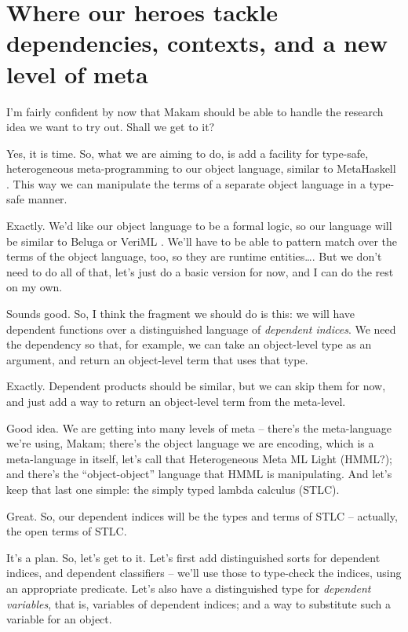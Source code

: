 \section{Where our heroes tackle dependencies, contexts, and a new level
of
meta}\label{where-our-heroes-tackle-dependencies-contexts-and-a-new-level-of-meta}

\heroSTUDENT{} I'm fairly confident by now that Makam should be able to handle
the research idea we want to try out. Shall we get to it?

\heroADVISOR{} Yes, it is time. So, what we are aiming to do, is add a
facility for type-safe, heterogeneous meta-programming to our object
language, similar to MetaHaskell \citep{mainland2012explicitly}. This
way we can manipulate the terms of a separate object language in a
type-safe manner.

\heroSTUDENT{} Exactly. We'd like our object language to be a formal logic, so
our language will be similar to Beluga \citep{pientka2010beluga} or
VeriML \citep{stampoulis2013veriml}. We'll have to be able to pattern
match over the terms of the object language, too, so they are runtime
entities\ldots{}. But we don't need to do all of that, let's just do a
basic version for now, and I can do the rest on my own.

\heroADVISOR{} Sounds good. So, I think the fragment we should do is this: we
will have dependent functions over a distinguished language of
\emph{dependent indices}. We need the dependency so that, for example,
we can take an object-level type as an argument, and return an
object-level term that uses that type.

\heroSTUDENT{} Exactly. Dependent products should be similar, but we can skip
them for now, and just add a way to return an object-level term from the
meta-level.

\heroADVISOR{} Good idea. We are getting into many levels of meta -- there's
the meta-language we're using, Makam; there's the object language we are
encoding, which is a meta-language in itself, let's call that
Heterogeneous Meta ML Light (HMML?); and there's the ``object-object''
language that HMML is manipulating. And let's keep that last one simple:
the simply typed lambda calculus (STLC).

\heroSTUDENT{} Great. So, our dependent indices will be the types and terms of
STLC -- actually, the open terms of STLC.

\heroADVISOR{} It's a plan. So, let's get to it. Let's first add distinguished
sorts for dependent indices, and dependent classifiers -- we'll use
those to type-check the indices, using an appropriate predicate. Let's
also have a distinguished type for \emph{dependent variables}, that is,
variables of dependent indices; and a way to substitute such a variable
for an object.

